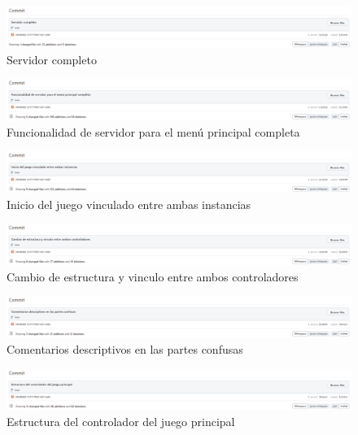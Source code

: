 \documentclass{article}
\begin{document}
\begin{figure}[H]
	\centering
	\includegraphics[width=1\textwidth,keepaspectratio]{img/commit_06.png}
	\caption{Servidor completo}
\end{figure}
\begin{figure}[H]
	\centering
	\includegraphics[width=1\textwidth,keepaspectratio]{img/commit_07.png}
	\caption{Funcionalidad de servidor para el menú principal completa}
\end{figure}
\begin{figure}[H]
	\centering
	\includegraphics[width=1\textwidth,keepaspectratio]{img/commit_08.png}
	\caption{Inicio del juego vinculado entre ambas instancias}
\end{figure}
\begin{figure}[H]
	\centering
	\includegraphics[width=1\textwidth,keepaspectratio]{img/commit_09.png}
	\caption{Cambio de estructura y vinculo entre ambos controladores}
\end{figure}
\begin{figure}[H]
	\centering
	\includegraphics[width=1\textwidth,keepaspectratio]{img/commit_10.png}
	\caption{Comentarios descriptivos en las partes confusas}
\end{figure}
\begin{figure}[H]
	\centering
	\includegraphics[width=1\textwidth,keepaspectratio]{img/commit_11.png}
	\caption{Estructura del controlador del juego principal}
\end{figure}
\end{document}
